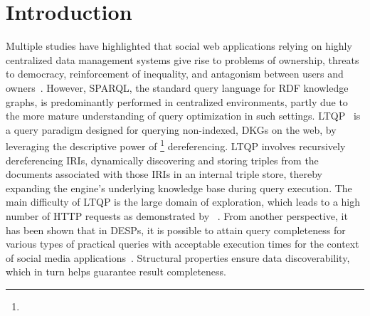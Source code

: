 \section{Introduction}



Multiple studies have highlighted that social web applications relying on highly centralized data management systems give rise to problems of ownership, threats to democracy, reinforcement of inequality, and antagonism between users and owners~\cite{Terranova2000FreeLP, Curran2016ch1, Sevignani2013, 9663788}.
However, SPARQL, the standard query language for \ac{RDF} knowledge graphs, is predominantly performed in centralized environments, partly due to the more mature understanding of query optimization in such settings.
\ac{LTQP}~\cite{Hartig2012} is a query paradigm designed for querying non-indexed, \acp{DKG} on the web, by leveraging the descriptive power of \footnote{} dereferencing.
\ac{LTQP} involves recursively dereferencing \acp{IRI}, dynamically discovering and storing triples from the documents associated with those \acp{IRI} in an internal triple store, thereby expanding the engine’s underlying knowledge base during query execution.
The main difficulty of \ac{LTQP} is the large domain of exploration, which leads to a high number of \ac{HTTP} requests as demonstrated by \citeauthor{hartig2016walking}~\cite{hartig2016walking}.
From another perspective, it has been shown that in \acp{DESP}, it is possible to attain query completeness for various types of practical queries with acceptable execution times for the context of social media applications~\cite{Taelman2023}.
Structural properties ensure data discoverability, which in turn helps guarantee result completeness.

